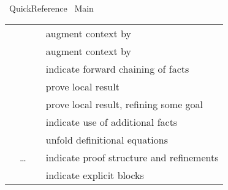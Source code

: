 %
\begin{isabellebody}%
\def\isabellecontext{Quick{\isacharunderscore}Reference}%
%
\isadelimtheory
\isanewline
\isanewline
%
\endisadelimtheory
%
\isatagtheory
{}\isamarkupfalse%
\ Quick{\isacharunderscore}Reference\isanewline
{}\ Main\isanewline
{}%
\endisatagtheory
{\isafoldtheory}%
%
\isadelimtheory
%
\endisadelimtheory
%
\isamarkuptrue%
%
\isamarkuptrue%
%
\isamarkuptrue%
%
\begin{isamarkuptext}%
\begin{tabular}{ll}
    \hyperlink{command.fix}{\mbox{\isa{\isacommand{fix}}}}~\isa{x} & augment context by \isa{{\isachardoublequote}{\isasymAnd}x{\isachardot}\ {\isasymbox}{\isachardoublequote}} \\
    \hyperlink{command.assume}{\mbox{\isa{\isacommand{assume}}}}~\isa{{\isachardoublequote}a{\isacharcolon}\ {\isasymphi}{\isachardoublequote}} & augment context by \isa{{\isachardoublequote}{\isasymphi}\ {\isasymLongrightarrow}\ {\isasymbox}{\isachardoublequote}} \\
    \hyperlink{command.then}{\mbox{\isa{\isacommand{then}}}} & indicate forward chaining of facts \\
    \hyperlink{command.have}{\mbox{\isa{\isacommand{have}}}}~\isa{{\isachardoublequote}a{\isacharcolon}\ {\isasymphi}{\isachardoublequote}} & prove local result \\
    \hyperlink{command.show}{\mbox{\isa{\isacommand{show}}}}~\isa{{\isachardoublequote}a{\isacharcolon}\ {\isasymphi}{\isachardoublequote}} & prove local result, refining some goal \\
    \hyperlink{command.using}{\mbox{\isa{\isacommand{using}}}}~\isa{a} & indicate use of additional facts \\
    \hyperlink{command.unfolding}{\mbox{\isa{\isacommand{unfolding}}}}~\isa{a} & unfold definitional equations \\
    \hyperlink{command.proof}{\mbox{\isa{\isacommand{proof}}}}~\isa{{\isachardoublequote}m\isactrlsub {\isadigit{1}}{\isachardoublequote}}~\dots~\hyperlink{command.qed}{\mbox{\isa{\isacommand{qed}}}}~\isa{{\isachardoublequote}m\isactrlsub {\isadigit{2}}{\isachardoublequote}} & indicate proof structure and refinements \\
    \hyperlink{command.braceleft}{\mbox{\isa{\isacommand{{\isacharbraceleft}}}}}~\isa{{\isachardoublequote}{\isasymdots}{\isachardoublequote}}~\hyperlink{command.braceright}{\mbox{\isa{\isacommand{{\isacharbraceright}}}}} & indicate explicit blocks \\

\end{tabular}
\end{isamarkuptext}
\end{isabellebody}
